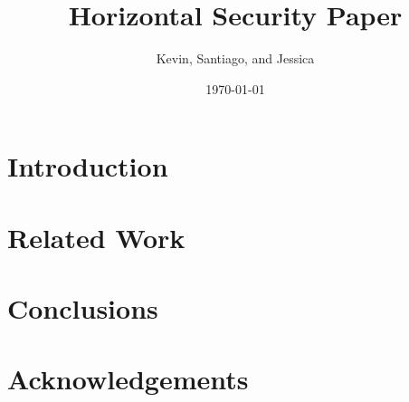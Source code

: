 \documentclass[twocolumn]{article}
\title{Horizontal Security Paper}
\author{Kevin, Santiago, and Jessica}
\date{\today}
\begin{document}
\maketitle

\begin{abstract}

\end{abstract}

\section{Introduction}
\label{sec:Introduction}


\section{Related Work}
\label{sec:RelatedWork}


\section{Conclusions}
\label{sec:Conclusions}


\section{Acknowledgements}
\label{sec:Acknowledgements}

\end{document}
